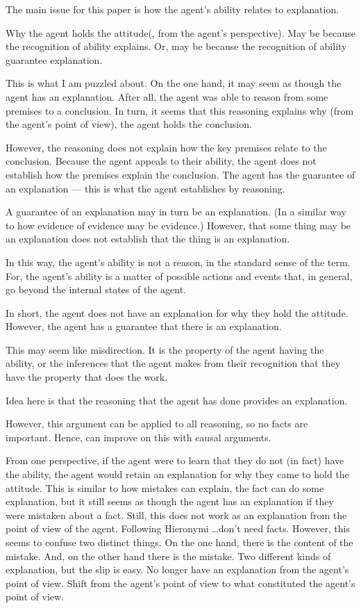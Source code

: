 \documentclass[10pt]{article}
\begin{document}
\begin{note}
  The main issue for this paper is how the agent's ability relates to explanation.

  Why the agent holds the attitude(, from the agent's perspective).
  May be because the recognition of ability explains.
  Or, may be because the recognition of ability guarantee explanation.

  This is what I am puzzled about.
  On the one hand, it may seem as though the agent has an explanation.
  After all, the agent was able to reason from some premises to a conclusion.
  In turn, it seems that this reasoning explains why (from the agent's point of view), the agent holds the conclusion.

  However, the reasoning does not explain how the key premises relate to the conclusion.
  Because the agent appeals to their ability, the agent does not establish how the premises explain the conclusion.
  The agent has the guarantee of an explanation --- this is what the agent establishes by reasoning.

  A guarantee of an explanation may in turn be an explanation.
  (In a similar way to how evidence of evidence may be evidence.)
  However, that some thing may be an explanation does not establish that the thing is an explanation.

  In this way, the agent's ability is not a reason, in the standard sense of the term.
  For, the agent's ability is a matter of possible actions and events that, in general, go beyond the internal states of the agent.

  In short, the agent does not have an explanation for why they hold the attitude.
  However, the agent has a guarantee that there is an explanation.

  This may seem like misdirection.
  It is the property of the agent having the ability, or the inferences that the agent makes from their recognition that they have the property that does the work.

  Idea here is that the reasoning that the agent has done provides an explanation.

  However, this argument can be applied to all reasoning, so no facts are important.
  Hence, can improve on this with causal arguments.

  From one perspective, if the agent were to learn that they do not (in fact) have the ability, the agent would retain an explanation for why they came to hold the attitude.
  This is similar to how mistakes can explain, the fact can do some explanation, but it still seems as though the agent has an explanation if they were mistaken about a fact.
  Still, this does not work as an explanation from the point of view of the agent.
  Following Hieronymi \dots don't need facts.
  However, this seems to confuse two distinct things.
  On the one hand, there is the content of the mistake.
  And, on the other hand there is the mistake.
  Two different kinds of explanation, but the slip is easy.
  No longer have an explanation from the agent's point of view.
  Shift from the agent's point of view to what constituted the agent's point of view.


\end{note}
\end{document}
